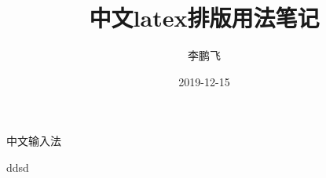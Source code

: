 \documentclass{article}%
\title{中文latex排版用法笔记}
\author{李鹏飞}
\date{2019-12-15}
\begin{document}
\maketitle
\newpage 

中文输入法



\begin{Large}
ddsd
\end{Large}
\end{document}
